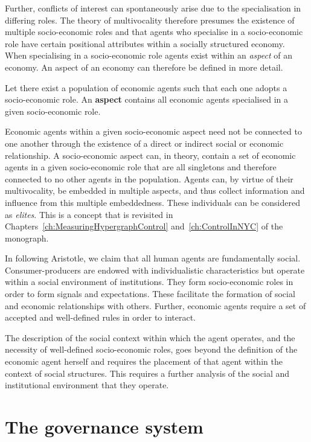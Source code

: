 Further, conflicts of interest can spontaneously arise due to the specialisation in differing roles. The theory of multivocality therefore presumes the existence of multiple socio-economic roles and that agents who specialise in a socio-economic role have certain positional attributes within a socially structured economy. When specialising in a socio-economic role agents exist within an \emph{aspect} of an economy. An aspect of an economy can therefore be defined in more detail.
\begin{definition}[Aspect] \label{def:aspect}
Let there exist a population of economic agents such that each one adopts a socio-economic role. An \textbf{aspect} contains all economic agents specialised in a given socio-economic role.
\end{definition}
Economic agents within a given socio-economic aspect need not be connected to one another through the existence of a direct or indirect social or economic relationship. A socio-economic aspect can, in theory, contain a set of economic agents in a given socio-economic role that are all singletons and therefore connected to no other agents in the population. Agents can, by virtue of their multivocality, be embedded in multiple aspects, and thus collect information and influence from this multiple embeddedness. These individuals can be considered as \emph{elites}. This is a concept that is revisited in Chapters~\ref{ch:MeasuringHypergraphControl} and~\ref{ch:ControlInNYC} of the monograph.

\medskip \noindent In following Aristotle, we claim that all human agents are fundamentally social. Consumer-producers are endowed with individualistic characteristics but operate within a social environment of institutions. They form socio-economic roles in order to form signals and expectations. These facilitate the formation of social and economic relationships with others. Further, economic agents require a set of accepted and well-defined rules in order to interact.

The description of the social context within which the agent operates, and the necessity of well-defined socio-economic roles, goes beyond the definition of the economic agent herself and requires the placement of that agent within the context of social structures. This requires a further analysis of the social and institutional environment that they operate.

\section{The governance system}
\label{sec:GovernanceSystem}


